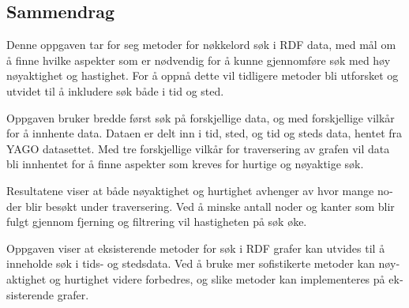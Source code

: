 
\begin{otherlanguage}{norsk}

\section*{Sammendrag}
Denne oppgaven tar for seg metoder for nøkkelord søk i RDF data, med mål om å finne hvilke aspekter som er nødvendig for å kunne gjennomføre søk med høy nøyaktighet og hastighet. For å oppnå dette vil tidligere metoder bli utforsket og utvidet til å inkludere søk både i tid og sted.

Oppgaven bruker bredde først søk på forskjellige data, og med forskjellige vilkår for å innhente data. Dataen er delt inn i tid, sted, og tid og steds data, hentet fra YAGO datasettet. Med tre forskjellige vilkår for traversering av grafen vil data bli innhentet for å finne aspekter som kreves for hurtige og nøyaktige søk.

Resultatene viser at både nøyaktighet og hurtighet avhenger av hvor mange noder blir besøkt under traversering. Ved å minske antall noder og kanter som blir fulgt gjennom fjerning og filtrering vil hastigheten på søk øke.

Oppgaven viser at eksisterende metoder for søk i RDF grafer kan utvides til å inneholde søk i tids- og stedsdata. Ved å bruke mer sofistikerte metoder kan nøyaktighet og hurtighet videre forbedres, og slike metoder kan implementeres på eksisterende grafer.

\end{otherlanguage}
